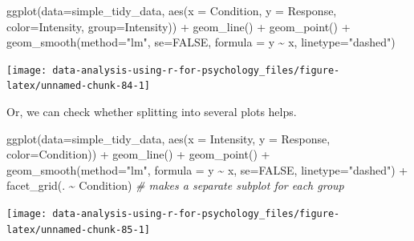 \documentclass[
]{book}
\newenvironment{Shaded}{\begin{snugshade}}{\end{snugshade}}
\newcommand{\AttributeTok}[1]{\textcolor[rgb]{0.77,0.63,0.00}{#1}}
\newcommand{\CommentTok}[1]{\textcolor[rgb]{0.56,0.35,0.01}{\textit{#1}}}
\newcommand{\ConstantTok}[1]{\textcolor[rgb]{0.00,0.00,0.00}{#1}}
\newcommand{\FunctionTok}[1]{\textcolor[rgb]{0.00,0.00,0.00}{#1}}
\newcommand{\NormalTok}[1]{#1}
\newcommand{\SpecialCharTok}[1]{\textcolor[rgb]{0.00,0.00,0.00}{#1}}
\newcommand{\StringTok}[1]{\textcolor[rgb]{0.31,0.60,0.02}{#1}}
\begin{document}
\begin{Shaded}
\begin{Highlighting}[]
\FunctionTok{ggplot}\NormalTok{(}\AttributeTok{data=}\NormalTok{simple\_tidy\_data, }\FunctionTok{aes}\NormalTok{(}\AttributeTok{x =}\NormalTok{ Condition, }\AttributeTok{y =}\NormalTok{ Response, }\AttributeTok{color=}\NormalTok{Intensity, }\AttributeTok{group=}\NormalTok{Intensity)) }\SpecialCharTok{+} 
  \FunctionTok{geom\_line}\NormalTok{() }\SpecialCharTok{+}
  \FunctionTok{geom\_point}\NormalTok{() }\SpecialCharTok{+}
  \FunctionTok{geom\_smooth}\NormalTok{(}\AttributeTok{method=}\StringTok{"lm"}\NormalTok{, }\AttributeTok{se=}\ConstantTok{FALSE}\NormalTok{,  }\AttributeTok{formula =}\NormalTok{ y }\SpecialCharTok{\textasciitilde{}}\NormalTok{ x, }\AttributeTok{linetype=}\StringTok{"dashed"}\NormalTok{)}
\end{Highlighting}
\end{Shaded}

\begin{center}\texttt{[image: data-analysis-using-r-for-psychology\_files/figure-latex/unnamed-chunk-84-1]} \end{center}

Or, we can check whether splitting into several plots helps.

\begin{Shaded}
\begin{Highlighting}[]
\FunctionTok{ggplot}\NormalTok{(}\AttributeTok{data=}\NormalTok{simple\_tidy\_data, }\FunctionTok{aes}\NormalTok{(}\AttributeTok{x =}\NormalTok{ Intensity, }\AttributeTok{y =}\NormalTok{ Response, }\AttributeTok{color=}\NormalTok{Condition)) }\SpecialCharTok{+} 
  \FunctionTok{geom\_line}\NormalTok{() }\SpecialCharTok{+}
  \FunctionTok{geom\_point}\NormalTok{() }\SpecialCharTok{+}
  \FunctionTok{geom\_smooth}\NormalTok{(}\AttributeTok{method=}\StringTok{"lm"}\NormalTok{, }\AttributeTok{formula =}\NormalTok{ y }\SpecialCharTok{\textasciitilde{}}\NormalTok{ x, }\AttributeTok{se=}\ConstantTok{FALSE}\NormalTok{, }\AttributeTok{linetype=}\StringTok{"dashed"}\NormalTok{) }\SpecialCharTok{+}
  \FunctionTok{facet\_grid}\NormalTok{(. }\SpecialCharTok{\textasciitilde{}}\NormalTok{ Condition) }\CommentTok{\# makes a separate subplot for each group}
\end{Highlighting}
\end{Shaded}

\begin{center}\texttt{[image: data-analysis-using-r-for-psychology\_files/figure-latex/unnamed-chunk-85-1]} \end{center}
\end{document}
